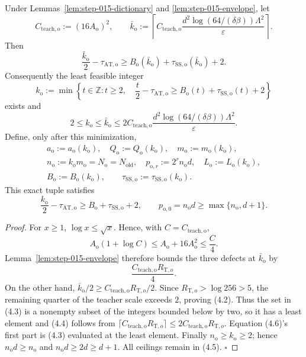 \begin{proposition}\label{prop:step-015-teacher}
Under Lemmas~\ref{lem:step-015-dictionary} and
\ref{lem:step-015-envelope}, let
\[
C_{\mathrm{teach,o}}:=(16A_{\mathrm o})^2,\qquad
\bar k_{\mathrm o}:=
\left\lceil C_{\mathrm{teach,o}}
\frac{d^2\log(64/(\delta\beta))\Lambda^2}{\varepsilon}
\right\rceil.
\tag{4.1}
\]
Then
\[
\frac{\bar k_{\mathrm o}}2-\tau_{\mathrm{AT,o}}
\ge B_{\mathrm o}(\bar k_{\mathrm o})
+\tau_{\mathrm{SS,o}}(\bar k_{\mathrm o})+2.
\tag{4.2}
\]
Consequently the least feasible integer
\[
k_{\mathrm o}:=
\min\left\{t\in\mathbb Z:t\ge2,\quad
\frac t2-\tau_{\mathrm{AT,o}}
\ge B_{\mathrm o}(t)+\tau_{\mathrm{SS,o}}(t)+2\right\}
\tag{4.3}
\]
exists and
\[
2\le k_{\mathrm o}\le\bar k_{\mathrm o}
\le2C_{\mathrm{teach,o}}
\frac{d^2\log(64/(\delta\beta))\Lambda^2}{\varepsilon}.
\tag{4.4}
\]
Define, only after this minimization,
\[
\begin{gathered}
a_{\mathrm o}:=a_{\mathrm o}(k_{\mathrm o}),\quad
Q_{\mathrm o}:=Q_{\mathrm o}(k_{\mathrm o}),\quad
m_{\mathrm o}:=m_{\mathrm o}(k_{\mathrm o}),\\
n_{\mathrm o}:=k_{\mathrm o}m_{\mathrm o}
=N_{\mathrm o}=N_{\mathrm{old}},\quad
p_{\mathrm o,r}:=2^rn_{\mathrm o}d,\quad
L_{\mathrm o}:=L_{\mathrm o}(k_{\mathrm o}),\\
B_{\mathrm o}:=B_{\mathrm o}(k_{\mathrm o}),\qquad
\tau_{\mathrm{SS,o}}:=\tau_{\mathrm{SS,o}}(k_{\mathrm o}).
\end{gathered}
\tag{4.5}
\]
This exact tuple satisfies
\[
\frac{k_{\mathrm o}}2-\tau_{\mathrm{AT,o}}
\ge B_{\mathrm o}+\tau_{\mathrm{SS,o}}+2,
\qquad
p_{\mathrm o,0}=n_{\mathrm o}d
\ge\max\{n_{\mathrm o},d+1\}.
\tag{4.6}
\]


\end{proposition}

\begin{proof}
For \(x\ge1\), \(\log x\le\sqrt x\). Hence, with
\(C=C_{\mathrm{teach,o}}\),
\[
A_{\mathrm o}(1+\log C)
\le A_{\mathrm o}+16A_{\mathrm o}^2
\le\frac C4.
\tag{4.7}
\]
Lemma~\ref{lem:step-015-envelope} therefore bounds the three defects at
\(\bar k_{\mathrm o}\) by
\[
\frac{C_{\mathrm{teach,o}}R_{\mathrm T,o}}4.
\tag{4.8}
\]
On the other hand,
\(\bar k_{\mathrm o}/2\ge
C_{\mathrm{teach,o}}R_{\mathrm T,o}/2\).
Since \(R_{\mathrm T,o}>\log256>5\), the remaining quarter of the
teacher scale exceeds \(2\), proving (4.2). Thus the set in (4.3) is a
nonempty subset of the integers bounded below by two, so it has a least
element and (4.4) follows from
\(\lceil C_{\mathrm{teach,o}}R_{\mathrm T,o}\rceil
\le2C_{\mathrm{teach,o}}R_{\mathrm T,o}\).
Equation (4.6)'s first part is (4.3) evaluated at the least element.
Finally \(n_{\mathrm o}\ge k_{\mathrm o}\ge2\); hence
\(n_{\mathrm o}d\ge n_{\mathrm o}\) and
\(n_{\mathrm o}d\ge2d\ge d+1\). All ceilings remain in (4.5).
\(\square\)


\end{proof}

